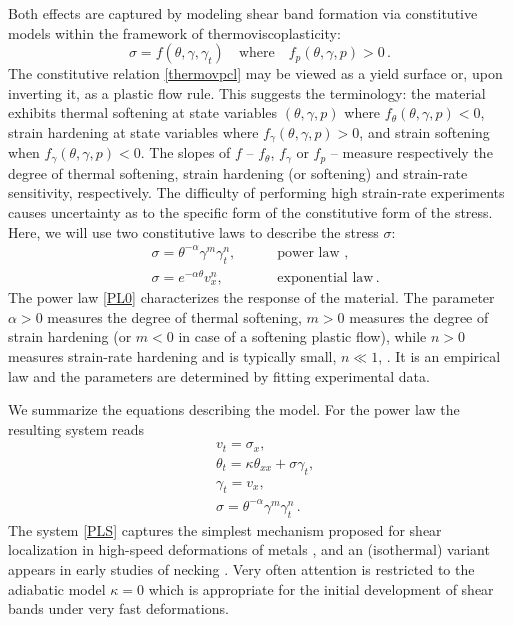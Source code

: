\documentclass[11pt]{article}
\newcommand{\ga}{\alpha}
\newcommand{\tht}{\theta}
\theoremstyle{remark}
\begin{document}
Both effects are captured by modeling shear band formation via constitutive models
within the framework  of thermoviscoplasticity:
\begin{equation}
\label{thermovpcl}
\sigma = f(\theta, \gamma, \gamma_t) \quad \mbox{where} \quad f_p (\theta, \gamma, p)  > 0 \, .
\end{equation}
The constitutive relation \eqref{thermovpcl} may be viewed as a yield surface or,  upon inverting it, as a plastic flow rule.
This suggests the terminology:
the material exhibits thermal softening at state variables $(\theta, \gamma, p)$
where $f_\theta(\theta, \gamma, p) < 0$, strain hardening at state variables where $f_\gamma(\theta, \gamma, p) > 0$, and strain softening when $f_\gamma(\theta, \gamma, p) < 0$.
The slopes of $f$ -- $f_\theta$, $f_\gamma$ or $f_p$ -- measure respectively the degree of thermal softening, strain hardening (or softening)
and strain-rate sensitivity, respectively.
The difficulty of performing high strain-rate experiments causes uncertainty as to the specific form of the constitutive form of the stress.  Here, we will
use two constitutive laws to describe the stress $\sigma$:
\begin{align}
&  \sigma =  \theta^{-\alpha} \gamma^{m} \gamma_{t}^{n}, \quad & &  \text{ power law }, \label{PL0}\\
& \sigma = e^{-\ga\tht} v_x^n, \quad & & \text{ exponential law} \label{ARL0}  \, .
\end{align}
The power law \eqref{PL0}  characterizes the response of the material. The parameter $\alpha>0$
measures the degree of thermal softening, $m>0$ measures the degree of strain hardening (or $m<0$ in case of a softening plastic flow), while $n>0$ measures strain-rate hardening and is typically small, $n \ll 1$, \cite{CDHS, clifton_rev_1990}. It is an empirical law and the parameters are determined by fitting experimental data.






We summarize the equations describing the model. For the power law
the resulting system reads
\begin{equation}
  \label{PLS}
  \begin{aligned}
    & v_{t} =  \sigma_{x},\\
    & \theta_{t} = \kappa \theta_{ x x}  +  \sigma \gamma_{t}, \\
    & \gamma_{t} = v_{x},  \\
    & \sigma  = \theta^{-\alpha}\gamma^{m}\gamma_{t}^n \, .
  \end{aligned}
\end{equation}
The system \eqref{PLS} captures the simplest mechanism proposed for shear localization in
high-speed deformations of metals \cite{ZH, clifton_rev_1990}, and an (isothermal) variant appears in early studies of necking \cite{HN77}.
Very often attention is restricted to the adiabatic model $\kappa = 0$ which is appropriate for the initial
development of shear bands under very fast deformations.
\end{document}
